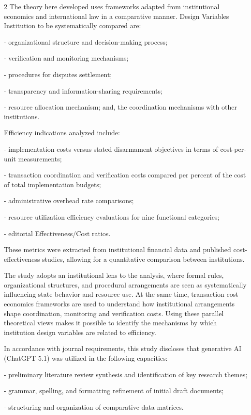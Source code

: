 \begin{multicols}{2}
The theory here developed uses frameworks adapted from institutional
economics and international law in a comparative manner. Design
Variables Institution to be systematically compared are:

- organizational structure and decision-making process;

- verification and monitoring mechanisms;

- procedures for disputes settlement;

- transparency and information-sharing requirements;

- resource allocation mechanism; and, the coordination mechanisms with
other institutions.

Efficiency indications analyzed include:

- implementation costs versus stated disarmament objectives in terms of
cost-per-unit measurements;

- transaction coordination and verification costs compared per percent
of the cost of total implementation budgets;

- administrative overhead rate comparisons;

- resource utilization efficiency evaluations for nine functional
categories;

- editorial Effectiveness/Cost ratios.

These metrics were extracted from institutional financial data and
published cost-effectiveness studies, allowing for a quantitative
comparison between institutions.

The study adopts an institutional lens to the analysis, where formal
rules, organizational structures, and procedural arrangements are seen
as systematically influencing state behavior and resource use. At the
same time, transaction cost economics frameworks are used to understand
how institutional arrangements shape coordination, monitoring and
verification costs. Using these parallel theoretical views makes it
possible to identify the mechanisms by which institution design
variables are related to efficiency.

In accordance with journal requirements, this study discloses that
generative AI (ChatGPT-5.1) was utilized in the following capacities:

- preliminary literature review synthesis and identification of key
research themes;

- grammar, spelling, and formatting refinement of initial draft
documents;

- structuring and organization of comparative data matrices.


\end{multicols}
